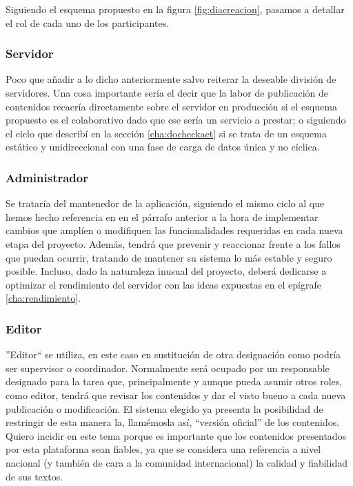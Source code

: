 \par Siguiendo el esquema propuesto en la figura \ref{fig:diacreacion}, pasamos a detallar el rol de cada uno de los participantes.


\subsubsection{Servidor}
\par Poco que añadir a lo dicho anteriormente salvo reiterar la deseable división de servidores. Una cosa importante sería el decir que la labor de publicación de contenidos recaería directamente sobre el servidor en producción si el esquema propuesto es el colaborativo dado que ese sería un servicio a prestar; o siguiendo el ciclo que describí en la sección \ref{cha:docheckact} si se trata de un esquema estático y unidireccional con una fase de carga de datos única y no cíclica.

\subsubsection{Administrador}
\par Se trataría del mantenedor de la aplicación, siguiendo el mismo ciclo al que hemos hecho referencia en en el párrafo anterior a la hora de implementar cambios que amplíen o modifiquen las funcionalidades requeridas en cada nueva etapa del proyecto. Además, tendrá que prevenir y reaccionar frente a los fallos que puedan ocurrir, tratando de mantener su sistema lo más estable y seguro posible. Incluso, dado la naturaleza inusual del proyecto, deberá dedicarse a optimizar el rendimiento del servidor con las ideas expuestas en el epígrafe \ref{cha:rendimiento}.

\subsubsection{Editor}
\par ''Editor`` se utiliza, en este caso en sustitución de otra designación como podría ser supervisor o coordinador. Normalmente será ocupado por un responsable designado para la tarea que, principalmente y aunque pueda asumir otros roles, como editor, tendrá que revisar los contenidos y dar el visto bueno a cada nueva publicación o modificación. El sistema elegido ya presenta la posibilidad de restringir de esta manera la, llamémosla así, ``versión oficial'' de los contenidos. Quiero incidir en este tema porque es importante que los contenidos presentados por esta plataforma sean fiables, ya que se considera una referencia a nivel nacional (y también de cara a la comunidad internacional) la calidad y fiabilidad de sus textos.

